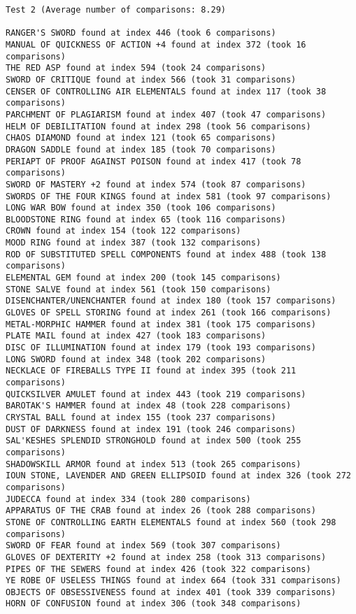 \documentclass{article}
\begin{document}
\pagebreak

\begin{verbatim}
Test 2 (Average number of comparisons: 8.29)

RANGER'S SWORD found at index 446 (took 6 comparisons)
MANUAL OF QUICKNESS OF ACTION +4 found at index 372 (took 16 comparisons)
THE RED ASP found at index 594 (took 24 comparisons)
SWORD OF CRITIQUE found at index 566 (took 31 comparisons)
CENSER OF CONTROLLING AIR ELEMENTALS found at index 117 (took 38 comparisons)
PARCHMENT OF PLAGIARISM found at index 407 (took 47 comparisons)
HELM OF DEBILITATION found at index 298 (took 56 comparisons)
CHAOS DIAMOND found at index 121 (took 65 comparisons)
DRAGON SADDLE found at index 185 (took 70 comparisons)
PERIAPT OF PROOF AGAINST POISON found at index 417 (took 78 comparisons)
SWORD OF MASTERY +2 found at index 574 (took 87 comparisons)
SWORDS OF THE FOUR KINGS found at index 581 (took 97 comparisons)
LONG WAR BOW found at index 350 (took 106 comparisons)
BLOODSTONE RING found at index 65 (took 116 comparisons)
CROWN found at index 154 (took 122 comparisons)
MOOD RING found at index 387 (took 132 comparisons)
ROD OF SUBSTITUTED SPELL COMPONENTS found at index 488 (took 138 comparisons)
ELEMENTAL GEM found at index 200 (took 145 comparisons)
STONE SALVE found at index 561 (took 150 comparisons)
DISENCHANTER/UNENCHANTER found at index 180 (took 157 comparisons)
GLOVES OF SPELL STORING found at index 261 (took 166 comparisons)
METAL-MORPHIC HAMMER found at index 381 (took 175 comparisons)
PLATE MAIL found at index 427 (took 183 comparisons)
DISC OF ILLUMINATION found at index 179 (took 193 comparisons)
LONG SWORD found at index 348 (took 202 comparisons)
NECKLACE OF FIREBALLS TYPE II found at index 395 (took 211 comparisons)
QUICKSILVER AMULET found at index 443 (took 219 comparisons)
BAROTAK'S HAMMER found at index 48 (took 228 comparisons)
CRYSTAL BALL found at index 155 (took 237 comparisons)
DUST OF DARKNESS found at index 191 (took 246 comparisons)
SAL'KESHES SPLENDID STRONGHOLD found at index 500 (took 255 comparisons)
SHADOWSKILL ARMOR found at index 513 (took 265 comparisons)
IOUN STONE, LAVENDER AND GREEN ELLIPSOID found at index 326 (took 272 comparisons)
JUDECCA found at index 334 (took 280 comparisons)
APPARATUS OF THE CRAB found at index 26 (took 288 comparisons)
STONE OF CONTROLLING EARTH ELEMENTALS found at index 560 (took 298 comparisons)
SWORD OF FEAR found at index 569 (took 307 comparisons)
GLOVES OF DEXTERITY +2 found at index 258 (took 313 comparisons)
PIPES OF THE SEWERS found at index 426 (took 322 comparisons)
YE ROBE OF USELESS THINGS found at index 664 (took 331 comparisons)
OBJECTS OF OBSESSIVENESS found at index 401 (took 339 comparisons)
HORN OF CONFUSION found at index 306 (took 348 comparisons)
\end{verbatim}
\end{document}
